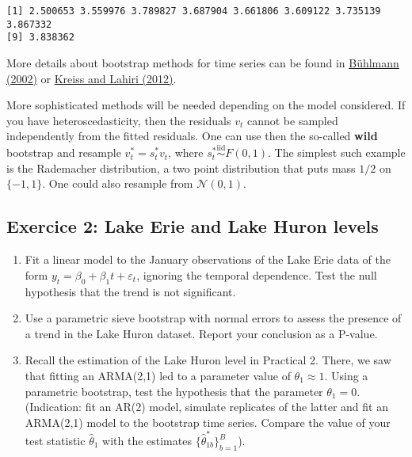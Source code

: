 \documentclass[]{book}
\providecommand{\tightlist}{%
  \setlength{\itemsep}{0pt}\setlength{\parskip}{0pt}}
\begin{document}
\begin{verbatim}
[1] 2.500653 3.559976 3.789827 3.687904 3.661806 3.609122 3.735139 3.867332
[9] 3.838362
\end{verbatim}

More details about bootstrap methods for time series can be found in
\href{https://projecteuclid.org/euclid.ss/1023798998}{Bühlmann (2002)}
or
\href{https://www.kevinsheppard.com/images/0/0a/Kreiss_and_lahiri.pdf}{Kreiss
and Lahiri (2012)}.

More sophisticated methods will be needed depending on the model
considered. If you have heteroscedasticity, then the residuals \(v_t\)
cannot be sampled independently from the fitted residuals. One can use
then the so-called \textbf{wild} bootstrap and resample
\(v_t^*=s_t^*v_t\), where \(s_t^* \stackrel{\mathrm{iid}}{\sim}F(0,1)\).
The simplest such example is the Rademacher distribution, a two point
distribution that puts mass \(1/2\) on \(\{-1, 1\}\). One could also
resample from \(\mathcal{N}(0,1)\).

\hypertarget{exercice-2-lake-erie-and-lake-huron-levels}{%
\subsection{Exercice 2: Lake Erie and Lake Huron
levels}\label{exercice-2-lake-erie-and-lake-huron-levels}}

\begin{enumerate}
\def\labelenumi{\arabic{enumi}.}
\tightlist
\item
  Fit a linear model to the January observations of the Lake Erie data
  of the form \(y_t=\beta_0+\beta_1t+\varepsilon_t\), ignoring the
  temporal dependence. Test the null hypothesis that the trend is not
  significant.
\item
  Use a parametric sieve bootstrap with normal errors to assess the
  presence of a trend in the Lake Huron dataset. Report your conclusion
  as a P-value.
\item
  Recall the estimation of the Lake Huron level in Practical 2. There,
  we saw that fitting an ARMA(2,1) led to a parameter value of
  \(\theta_1 \approx 1\). Using a parametric bootstrap, test the
  hypothesis that the parameter \(\theta_1=0\). (Indication: fit an
  AR(2) model, simulate replicates of the latter and fit an ARMA(2,1)
  model to the bootstrap time series. Compare the value of your test
  statistic \(\hat{\theta}_1\) with the estimates
  \(\{\hat{\theta}_{1b}^{*}\}_{b=1}^B\)).
\end{enumerate}
\end{document}
